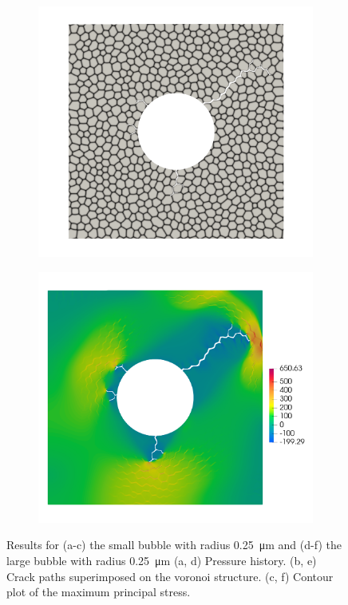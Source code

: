 \begin{figure}[htb!]
\begin{subfigure}[t]{0.32\linewidth}
    \caption{}
  \end{subfigure}
  \begin{subfigure}[t]{0.32\linewidth}
    \centering
    \includegraphics[width=\linewidth]{Chapter3/figures/r5_ext0}
    \caption{}
  \end{subfigure}
  \begin{subfigure}[t]{0.32\linewidth}
    \centering
    \includegraphics[width=\linewidth]{Chapter3/figures/r5_ext0_stress}
    \caption{}
  \end{subfigure}
  \caption[Crack propagation from bubbles with different sizes.]{Results for (a-c) the small bubble with radius \SI{0.25}{\micro\meter} and (d-f) the large bubble with radius \SI{0.25}{\micro\meter} (a, d) Pressure history. (b, e) Crack paths superimposed on the voronoi structure. (c, f) Contour plot of the maximum principal stress.}
  \label{fig:r25}
\end{figure}

